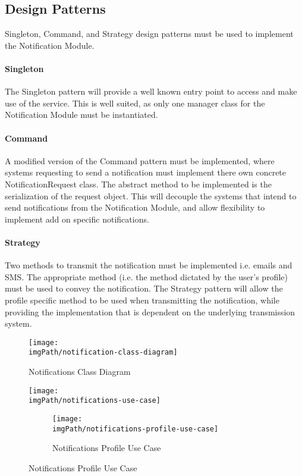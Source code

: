 \subsection{Design Patterns}
Singleton, Command, and Strategy design patterns must be used to implement the Notification Module.

\paragraph{Singleton}
The Singleton pattern will provide a well known entry point to access and make use of the service. This is well suited, as only one manager class for the Notification Module must be instantiated. 

\paragraph{Command}
A modified version of the Command pattern must be implemented, where systems requesting to send a notification must implement there own concrete NotificationRequest class. The abstract method to be implemented is the serialization of the request object. This will decouple the systems that intend to send notifications from the Notification Module, and allow flexibility to implement add on specific notifications.

\paragraph{Strategy}
Two methods to transmit the notification must be implemented i.e. emails and SMS. The appropriate method (i.e. the method dictated by the user's profile) must be used to convey the notification. The Strategy pattern will allow the profile specific method to be used when transmitting the notification, while providing the implementation that is dependent on the underlying transmission system.



\begin{figure}[H]
\centering
\texttt{[image: \\imgPath/notification-class-diagram]}
\caption{Notifications Class Diagram}
\end{figure}

\begin{figure}[H]
\centering
\texttt{[image: \\imgPath/notifications-use-case]}
\caption{Notifications Request and Send Use Case}

\begin{figure}[H]
\centering
\texttt{[image: \\imgPath/notifications-profile-use-case]}
\caption{Notifications Profile Use Case}
\end{figure}
\end{figure}
